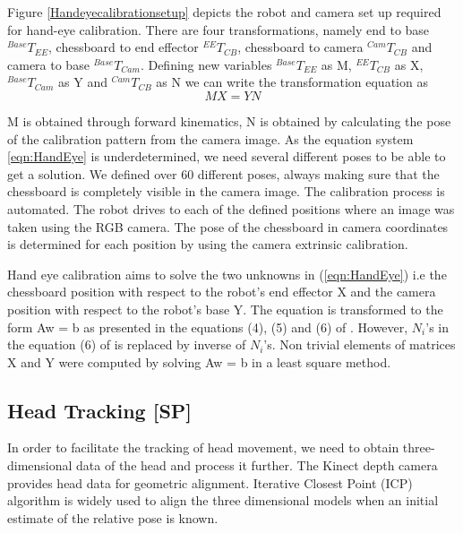 Figure \ref{Handeyecalibrationsetup} depicts the robot and camera set up required for hand-eye calibration. There are four transformations, namely end  to base  ${}^{Base}T_{EE}$, chessboard to end effector  ${}^{EE}T_{CB}$, chessboard to camera  ${}^{Cam}T_{CB}$ and camera to base  ${}^{Base}T_{Cam}$. Defining new variables  ${}^{Base}T_{EE}$ as M,  ${}^{EE}T_{CB}$ as X,  ${}^{Base}T_{Cam}$ as Y and  ${}^{Cam}T_{CB}$ as N we can write the transformation equation as 
\begin{equation}
    MX = YN
    \label{eqn:HandEye}
\end{equation}

M is obtained through forward kinematics, N is obtained by calculating the pose of the calibration pattern from the camera image. 
As the equation system \ref{eqn:HandEye} is underdetermined, we need several different poses to be able to get a solution. We defined over 60 different poses, always making sure that the chessboard is completely visible in the camera image. The calibration process is automated. The robot drives to each of the defined positions where an image was taken using the RGB camera. The pose of the chessboard in camera coordinates is determined for each position by using the camera extrinsic calibration.


Hand eye calibration aims to solve the two unknowns in (\ref{eqn:HandEye}) i.e the chessboard position with respect to the robot's end effector X and the camera position with respect to the robot's base Y. The equation is transformed to the form Aw = b as presented in the equations (4), (5) and (6) of \cite{ernst2012non}. However, $N_i$’s in the equation (6) of \cite{ernst2012non} is replaced by inverse of $N_i$’s. Non trivial elements of matrices X and Y were computed by solving Aw = b in a least square method.


\subsection{Head Tracking [SP]}

In order to facilitate the tracking of head movement, we need to obtain three-dimensional data of the head and process it further. The Kinect depth camera provides head data for geometric alignment. Iterative Closest Point (ICP) algorithm is widely used to align the three dimensional models when an initial estimate of the relative pose is known.

